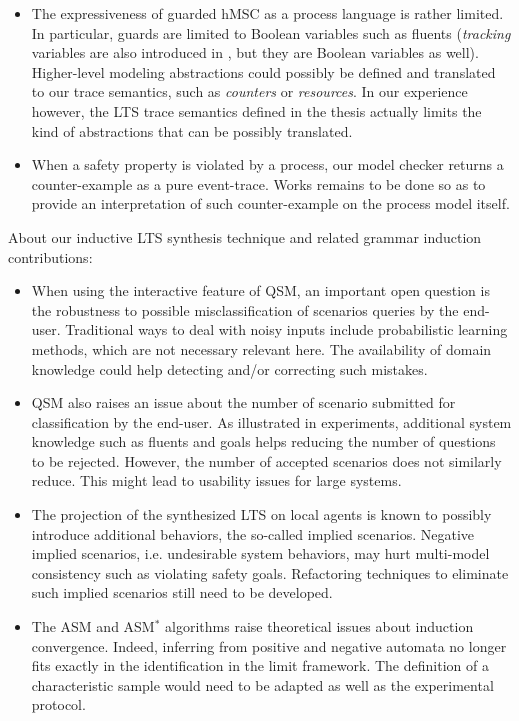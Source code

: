 \begin{itemize}

\item The expressiveness of guarded hMSC as a process language is rather limited. In particular, guards are limited to Boolean variables such as fluents (\emph{tracking} variables are also introduced in \cite{Damas:2011}, but they are Boolean variables as well). Higher-level modeling abstractions could possibly be defined and translated to our trace semantics, such as \emph{counters} or \emph{resources}. In our experience however, the LTS trace semantics defined in the thesis actually limits the kind of abstractions that can be possibly translated. 

\item When a safety property is violated by a process, our model checker returns a counter-example as a pure event-trace. Works remains to be done so as to provide an interpretation of such counter-example on the process model itself. 

\end{itemize}

About our inductive LTS synthesis technique and related grammar induction contributions:

\begin{itemize}

\item When using the interactive feature of QSM, an important open question is the robustness to possible misclassification of scenarios queries by the end-user. Traditional ways to deal with noisy inputs include probabilistic learning methods, which are not necessary relevant here. The availability of domain knowledge could help detecting and/or correcting such mistakes.

\item QSM also raises an issue about the number of scenario submitted for classification by the end-user. As illustrated in experiments, additional system knowledge such as fluents and goals helps reducing the number of questions to be rejected. However, the number of accepted scenarios does not similarly reduce. This might lead to usability issues for large systems.

\item The projection of the synthesized LTS on local agents is known to possibly introduce additional behaviors, the so-called implied scenarios. Negative implied scenarios, i.e. undesirable system behaviors, may hurt multi-model consistency such as violating safety goals. Refactoring techniques to eliminate such implied scenarios still need to be developed.

\item The ASM and ASM$^*$ algorithms raise theoretical issues about induction convergence. Indeed, inferring from positive and negative automata no longer fits exactly in the identification in the limit framework. The definition of a characteristic sample would
need to be adapted as well as the experimental protocol.

\end{itemize}

